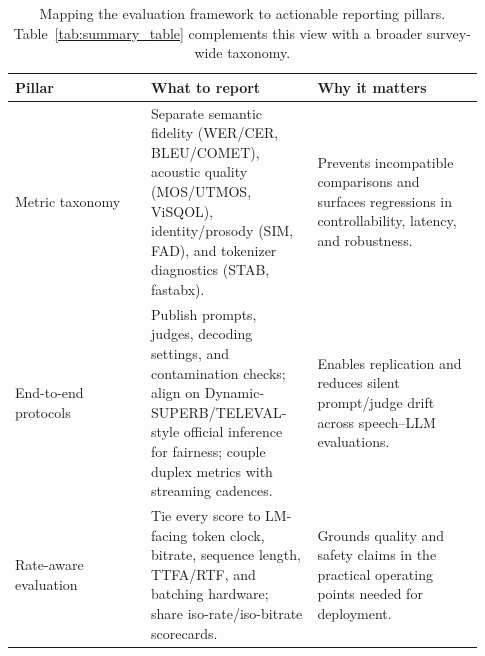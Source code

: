 \begin{table}[ht]
    \centering
    \small
    \setlength{\tabcolsep}{6pt}
    \renewcommand{\arraystretch}{1.2}
    \begin{tabular}{p{0.27\linewidth} p{0.33\linewidth} p{0.33\linewidth}}
        \toprule
        \textbf{Pillar} & \textbf{What to report} & \textbf{Why it matters} \\
        \midrule
        Metric taxonomy & Separate semantic fidelity (WER/CER, BLEU/COMET), acoustic quality (MOS/UTMOS, ViSQOL), identity/prosody (SIM, FAD), and tokenizer diagnostics (STAB, fastabx). & Prevents incompatible comparisons and surfaces regressions in controllability, latency, and robustness. \\
        End-to-end protocols & Publish prompts, judges, decoding settings, and contamination checks; align on Dynamic-SUPERB/TELEVAL-style official inference for fairness; couple duplex metrics with streaming cadences. & Enables replication and reduces silent prompt/judge drift across speech–LLM evaluations. \\
        Rate-aware evaluation & Tie every score to LM-facing token clock, bitrate, sequence length, TTFA/RTF, and batching hardware; share iso-rate/iso-bitrate scorecards. & Grounds quality and safety claims in the practical operating points needed for deployment. \\
        \bottomrule
    \end{tabular}
    \caption{Mapping the evaluation framework to actionable reporting pillars. Table~\ref{tab:summary_table} complements this view with a broader survey-wide taxonomy.}
    \label{tab:comparison_table}
\end{table}
